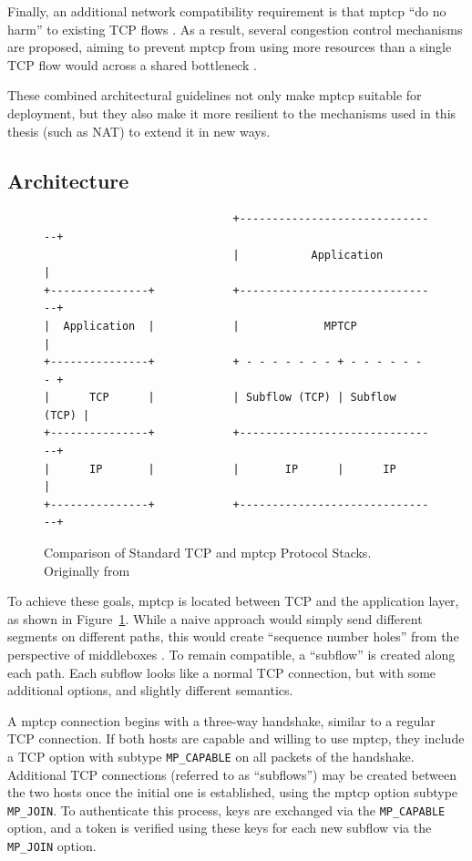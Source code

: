 \documentclass{cwru}
\begin{document}
Finally, an additional network compatibility requirement is that \acl{mptcp}
``do no harm'' to existing TCP flows \cite{rfc6182}. As a result, several
congestion control mechanisms are proposed, aiming to prevent \ac{mptcp} from
using more resources than a single TCP flow would across a shared bottleneck
\cite{rfc6356,draft-olia,draft-balia,draft-wvegas}.

These combined architectural guidelines not only make \ac{mptcp} suitable for
deployment, but they also make it more resilient to the mechanisms used in this
thesis (such as NAT) to extend it in new ways.

\subsection{Architecture}

\begin{figure}[h]
  \centering
\begin{BVerbatim}
                             +-------------------------------+
                             |           Application         |
+---------------+            +-------------------------------+
|  Application  |            |             MPTCP             |
+---------------+            + - - - - - - - + - - - - - - - +
|      TCP      |            | Subflow (TCP) | Subflow (TCP) |
+---------------+            +-------------------------------+
|      IP       |            |       IP      |      IP       |
+---------------+            +-------------------------------+
\end{BVerbatim}
\caption[Comparison of TCP and \acs{mptcp} Protocol Stacks]{Comparison of
  Standard TCP and \ac{mptcp} Protocol Stacks. Originally from \cite{rfc6824}}
  \label{fig:layers}
\end{figure}

To achieve these goals, \ac{mptcp} is located between TCP and the application
layer, as shown in Figure~\ref{fig:layers}. While a naive approach would simply
send different segments on different paths, this would create ``sequence
number holes'' from the perspective of middleboxes \cite{raiciu2012hard}. To
remain compatible, a ``subflow'' is created along each path. Each subflow looks
like a normal TCP connection, but with some additional options, and slightly
different semantics.

A \ac{mptcp} connection begins with a three-way handshake, similar to a regular
TCP connection. If both hosts are capable and willing to use \ac{mptcp}, they
include a TCP option with subtype \texttt{MP\_CAPABLE} on all packets of the
handshake. Additional TCP connections (referred to as ``subflows'') may be
created between the two hosts once the initial one is established, using the
\ac{mptcp} option subtype \texttt{MP\_JOIN}. To authenticate this process, keys
are exchanged via the \texttt{MP\_CAPABLE} option, and a token is verified using
these keys for each new subflow via the \texttt{MP\_JOIN} option.
\end{document}
